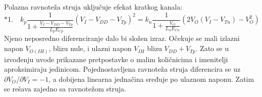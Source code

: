 Polazna ravnoteža struja uključuje efekat kratkog kanala:
\[*1.\quad k_p\frac1{1+\frac{V_I-V_{DD}-V_{Tp}}{L_pE_{Cp}}}(V_I-V_{DD}-V_{Tp})^2=k_n\frac1{1+\frac{V_O}{L_nE_{Cn}}}\left(2V_O(V_I-V_{Tn})-V_O^2\right)\]
Njeno neposredno diferenciranje dalo bi složen izraz. Očekuje se mali izlazni napon $V_{O(IH)}$, blizu nule, i ulazni napon $V_{IH}$ blizu $V_{DD}+V_{Tp}$. Zato se u izvođenju uvode prikazane pretpostavke o malim količnicima i imenitelji aproksimiraju jedinicom. Pojednostavljena ravnoteža struja diferencira se uz $\partial V_O/\partial V_I=-1$, a dobijena linearna jednačina sređuje po ulaznom naponu. Zatim se rešava zajedno sa ravnotežom struja.
